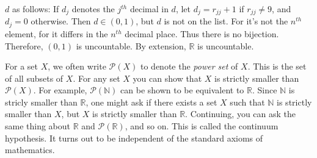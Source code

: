 \documentclass[crop=false,class=book,oneside]{standalone}
\begin{document}
            $d$ as follows: If $d_{j}$ denotes the $j^{th}$
            decimal in $d$, let $d_{j}=r_{jj}+1$ if
            $r_{jj}\ne{9}$, and $d_{j}=0$ otherwise. Then
            $d\in(0,1)$, but $d$ is not on the list. For it's not
            the $n^{th}$ element, for it differs in the
            $n^{th}$ decimal place. Thus there is no bijection.
            Therefore, $(0,1)$ is uncountable. By extension,
            $\mathbb{R}$ is uncountable.
            \par\hfill\par
            \vspace{-2ex}
            For a set $X$, we often write
            $\mathcal{P}(X)$ to denote the
            \textit{power set} of $X$. This is the
            set of all subsets of $X$.
            For any set $X$ you can show that $X$ is
            strictly smaller than $\mathcal{P}(X)$.
            For example, $\mathcal{P}(\mathbb{N})$
            can be shown to be equivalent to $\mathbb{R}$.
            Since $\mathbb{N}$ is stricly smaller than
            $\mathbb{R}$, one might ask if there exists
            a set $X$ such that $\mathbb{N}$ is strictly
            smaller than $X$, but $X$ is strictly smaller
            than $\mathbb{R}$. Continuing, you can ask the
            same thing about $\mathbb{R}$ and
            $\mathcal{P}(\mathbb{R})$, and so on.
            This is called the continuum hypothesis.
            It turns out to be independent of
            the standard axioms of mathematics.
\end{document}
